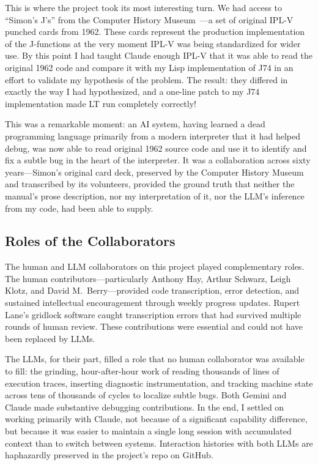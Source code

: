 \documentclass[journal]{IEEEtran}
\begin{document}
This is where the project took its most interesting turn.  We had
access to ``Simon's J's'' from the Computer History
Museum~\cite{bochannek2012simonsjs}---a set of original IPL-V punched
cards from 1962.  These cards represent the production implementation
of the J-functions at the very moment IPL-V was being standardized for
wider use.  By this point I had taught Claude enough IPL-V that it was
able to read the original 1962 code and compare it with my Lisp
implementation of J74 in an effort to validate my hypothesis of the
problem. The result: they differed in exactly the way I had
hypothesized, and a one-line patch to my J74 implementation made LT
run completely correctly!

This was a remarkable moment: an AI system, having learned a dead
programming language primarily from a modern interpreter that it had
helped debug, was now able to read original 1962 source code and use
it to identify and fix a subtle bug in the heart of the
interpreter. It was a collaboration across sixty years---Simon's
original card deck, preserved by the Computer History Museum and
transcribed by its volunteers, provided the ground truth that neither
the manual's prose description, nor my interpretation of it, nor the
LLM's inference from my code, had been able to supply.

\subsection{Roles of the Collaborators}

The human and LLM collaborators on this project played complementary
roles. The human contributors---particularly Anthony Hay, Arthur
Schwarz, Leigh Klotz, and David M.\ Berry---provided code
transcription, error detection, and sustained intellectual
encouragement through weekly progress updates. Rupert Lane's gridlock
software caught transcription errors that had survived multiple rounds
of human review. These contributions were essential and could not have
been replaced by LLMs.

The LLMs, for their part, filled a role that no human collaborator was
available to fill: the grinding, hour-after-hour work of reading
thousands of lines of execution traces, inserting diagnostic
instrumentation, and tracking machine state across tens of thousands
of cycles to localize subtle bugs. Both Gemini and Claude made
substantive debugging contributions. In the end, I settled on working
primarily with Claude, not because of a significant capability
difference, but because it was easier to maintain a single long
session with accumulated context than to switch between
systems. Interaction histories with both LLMs are haphazardly preserved
in the project's repo on GitHub.
\end{document}
